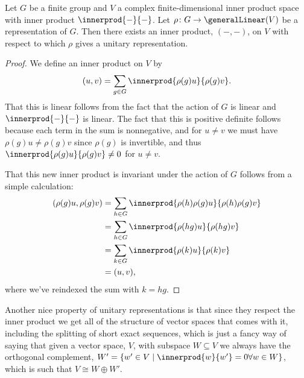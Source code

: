 \documentclass[fleqn]{NotesClass}
\newcommand{\isomorphic}{\cong}
\begin{document}
    \begin{thm}{}{}
        Let \(G\) be a finite group and \(V\) a complex finite-dimensional inner product space with inner product \(\innerprod{-}{-}\).
        Let \(\rho \colon G \to \generalLinear(V)\) be a representation of \(G\).
        Then there exists an inner product, \((-,-)\), on \(V\) with respect to which \(\rho\) gives a unitary representation.
        \begin{proof}
            We define an inner product on \(V\) by
            \begin{equation}
                (u, v) = \sum_{g \in G} \innerprod{\rho(g)u}{\rho(g)v}.
            \end{equation}
            That this is linear follows from the fact that the action of \(G\) is linear and \(\innerprod{-}{-}\) is linear.
            The fact that this is positive definite follows because each term in the sum is nonnegative, and for \(u \ne v\) we must have \(\rho(g)u \ne \rho(g)v\) since \(\rho(g)\) is invertible, and thus \(\innerprod{\rho(g)u}{\rho(g)v} \ne 0\) for \(u \ne v\).
            
            That this new inner product is invariant under the action of \(G\) follows from a simple calculation:
            \begin{align}
                (\rho(g)u, \rho(g)v) &= \sum_{h \in G} \innerprod{\rho(h)\rho(g)u}{\rho(h)\rho(g)v}\\
                &= \sum_{h \in G} \innerprod{\rho(hg)u}{\rho(hg)v}\\
                &= \sum_{k \in G} \innerprod{\rho(k)u}{\rho(k)v}\\
                &= (u, v),
            \end{align}
            where we've reindexed the sum with \(k = hg\).
        \end{proof}
    \end{thm}
    
    Another nice property of unitary representations is that since they respect the inner product we get all of the structure of vector spaces that comes with it, including the splitting of short exact sequences, which is just a fancy way of saying that given a vector space, \(V\), with subspace \(W \subseteq V\) we always have the orthogonal complement, \(W' = \{w' \in V \mid \innerprod{w}{w'} = 0 \forall w \in W\}\), which is such that \(V \isomorphic W \oplus W'\).
    
\end{document}
